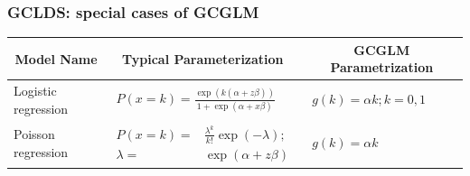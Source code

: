 \documentclass[16pt,presentation]{beamer}
\begin{document}
\begin{frame}
\frametitle{GCLDS: special cases of GCGLM}
\begin{centering}
{\scriptsize
\begin{tabular}{ lll}
\hline
 \multicolumn{1}{c}{\bf Model Name} &  \multicolumn{1}{c}{\bf Typical Parameterization} &  \multicolumn{1}{c}{\bf GCGLM Parametrization} \\
\hline
\parbox{0.2\textwidth}{Logistic regression } & $\begin{aligned} P(x=k) = \frac{\exp\left(k (\alpha + z\beta)\right)}{1 + \exp(\alpha + x\beta)}  \end{aligned}$ & $\begin{aligned} g(k) = \alpha k; k = 0,1\end{aligned}$\\
 \hline
   \parbox{0.2\textwidth}{Poisson regression} & $\begin{aligned} P(x=k) =& \frac{\lambda^{k}}{k!}\exp(-\lambda);\\ \lambda =& \exp(\alpha + z\beta)\end{aligned}$& $\begin{aligned} g(k) = \alpha k \end{aligned}$\\
  \hline


\end{tabular}}
\end{centering}
\end{frame}
\end{document}
